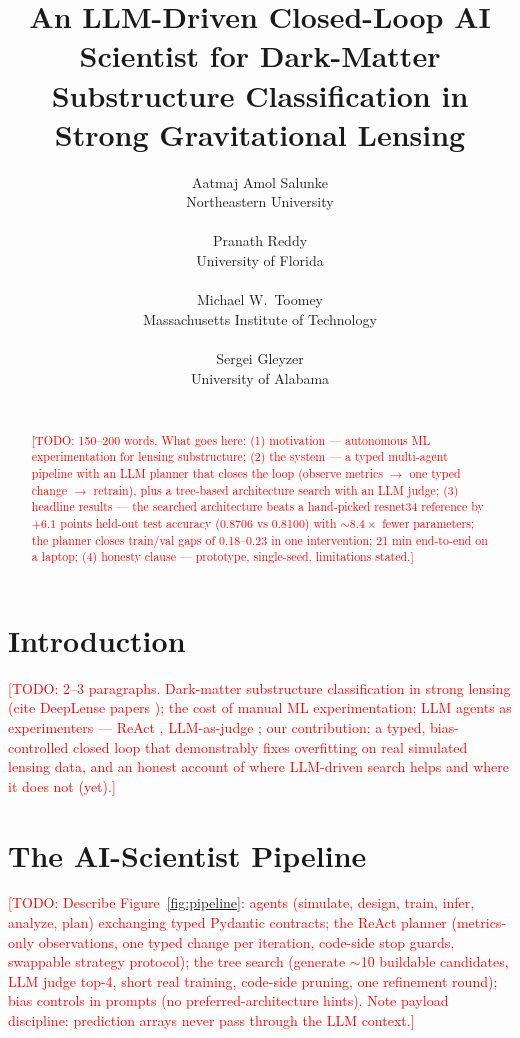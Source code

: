 \documentclass{article}
\title{An LLM-Driven Closed-Loop AI Scientist for Dark-Matter Substructure
Classification in Strong Gravitational Lensing}
\author{%
  Aatmaj Amol Salunke\\
  Northeastern University\\
  \texttt{\todo{email}}\\
  \And
  Pranath Reddy\\
  University of Florida\\
  \texttt{\todo{email}}\\
  \And
  Michael W.\ Toomey\\
  Massachusetts Institute of Technology\\
  \texttt{\todo{email}}\\
  \And
  Sergei Gleyzer\\
  University of Alabama\\
  \texttt{\todo{email}}\\
}
\newcommand{\todo}[1]{\textcolor{red}{[TODO: #1]}}
\begin{document}
\maketitle

\begin{abstract}
\todo{150--200 words. What goes here: (1) motivation — autonomous ML
experimentation for lensing substructure; (2) the system — a typed multi-agent
pipeline with an LLM planner that closes the loop (observe metrics $\to$ one typed
change $\to$ retrain), plus a tree-based architecture search with an LLM judge;
(3) headline results — the searched architecture beats a hand-picked resnet34
reference by $+6.1$ points held-out test accuracy (0.8706 vs 0.8100) with
${\sim}8.4\times$ fewer parameters; the planner closes train/val gaps of 0.18--0.23
in one intervention; 21 min end-to-end on a laptop;
(4) honesty clause — prototype, single-seed, limitations stated.}
\end{abstract}

\section{Introduction}
\todo{2--3 paragraphs. Dark-matter substructure classification in strong lensing
(cite DeepLense papers \citep{alexander2020deep,alexander2021decoding,toomey2022deep});
the cost of manual ML experimentation; LLM agents as experimenters — ReAct
\citep{yao2023react}, LLM-as-judge \citep{zheng2023judging}; our contribution: a
typed, bias-controlled closed loop that demonstrably fixes overfitting on real
simulated lensing data, and an honest account of where LLM-driven search helps and
where it does not (yet).}

\section{The AI-Scientist Pipeline}
\label{sec:pipeline}
\todo{Describe Figure~\ref{fig:pipeline}: agents (simulate, design, train, infer,
analyze, plan) exchanging typed Pydantic contracts; the ReAct planner (metrics-only
observations, one typed change per iteration, code-side stop guards, swappable
strategy protocol); the tree search (generate $\sim$10 buildable candidates, LLM
judge top-4, short real training, code-side pruning, one refinement round); bias
controls in prompts (no preferred-architecture hints). Note payload discipline:
prediction arrays never pass through the LLM context.}
\end{document}
